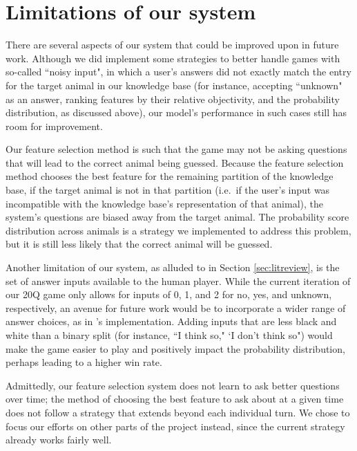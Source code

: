 \documentclass[11pt,a4paper]{article}
\begin{document}
\section{Limitations of our system}
\label{sec:limit}

There are several aspects of our system that could be improved upon in future work. 
Although we did implement some strategies to better handle games with so-called ``noisy input", in which a user's answers did not exactly match the entry for the target animal in our knowledge base (for instance, accepting ``unknown" as an answer, ranking features by their relative objectivity, and the probability distribution, as discussed above), our model's performance in such cases still has room for improvement. 

Our feature selection method is such that the game may not be asking questions that will lead to the correct animal being guessed. 
Because the feature selection method chooses the best feature for the remaining partition of the knowledge base, if the target animal is not in that partition (i.e.\ if the user's input was incompatible with the knowledge base's representation of that animal), the system's questions are biased away from the target animal. 
The probability score distribution across animals is a strategy we implemented to address this problem, but it is still less likely that the correct animal will be guessed.

Another limitation of our system, as alluded to in Section \ref{sec:litreview}, is the set of answer inputs available to the human player. While the current iteration of our 20Q game only allows for inputs of 0, 1, and 2 for no, yes, and unknown, respectively, an avenue for future work would be to incorporate a wider range of answer choices, as in \citet{Burgener2006}'s implementation. Adding inputs that are less black and white than a binary split (for instance, ``I think so," `I don't think so") would make the game easier to play and positively impact the probability distribution, perhaps leading to a higher win rate. 

Admittedly, our feature selection system does not learn to ask better questions over time; the method of choosing the best feature to ask about at a given time does not follow a strategy that extends beyond each individual turn. We chose to focus our efforts on other parts of the project instead, since the current strategy already works fairly well.
\end{document}
